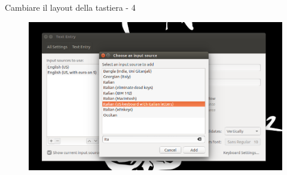 \begin{frame}{Cambiare il layout della tastiera - 4}

\begin{figure}
\centering
\includegraphics[scale=0.31]{res/img/4}
\end{figure}

\end{frame}